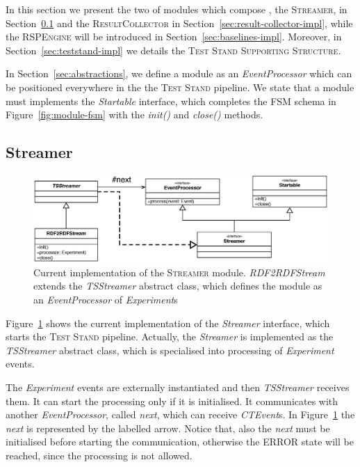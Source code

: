 In this section we present the two of modules which compose \namens, the \textsc{Streamer}, in Section~\ref{sec:streamer-impl} and the \textsc{ResultCollector} in Section~\ref{sec:result-collector-impl}, while the \textsc{RSPEngine} will be introduced in Section~\ref{sec:baselines-impl}. Moreover, in Section~\ref{sec:teststand-impl} we details the \textsc{Test Stand Supporting Structure}. %

In Section~\ref{sec:abstractions}, we define a module as an \textit{EventProcessor} which can be positioned everywhere in the the \textsc{Test Stand} pipeline. We state that a module must implements the \textit{Startable} interface, which completes the FSM schema in Figure~\ref{fig:module-fsm} with the \textit{init()} and \textit{close()} methods.

\subsection{Streamer}	\label{sec:streamer-impl}

\begin{figure}[tbh]
  \centering
	\includegraphics[width=\linewidth]{images/uml_tstreamer}
	\caption[\textit{RDF2RDFStream \textsc{Streamer} Implementation} - UML Schema]{Current implementation of the \textsc{Streamer} module. \textit{RDF2RDFStream} extends the \textit{TSStreamer} abstract class, which defines the module as an \textit{EventProcessor} of \textit{Experiment}s} 
  	\label{fig:uml_tstreamer}
\end{figure}

\noindent Figure~\ref{fig:uml_tstreamer} shows the current implementation of the \textit{Streamer} interface, which starts the \textsc{Test Stand} pipeline. Actually, the \textit{Streamer} is implemented as the \textit{TSStreamer} abstract class, which is specialised into processing of \textit{Experiment} events. 

The \textit{Experiment} events are  externally instantiated and then \textit{TSStreamer} receives them. It can start the processing only if it is initialised. It communicates with another \textit{EventProcessor}, called \textit{next}, which can receive  \textit{CTEvent}s. In Figure~\ref{fig:uml_tstreamer} the \textit{next} is represented by the labelled arrow.  Notice that, also the \textit{next} must be initialised before starting the communication, otherwise the ERROR state will be reached, since the processing is not allowed.

